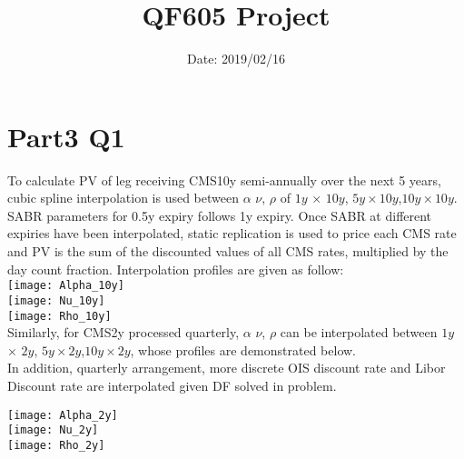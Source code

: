 \documentclass{article}
\title{\textbf{QF605 Project}}
\date{Date: 2019/02/16}
\begin{document}
	\maketitle

\section{Part3 Q1}

\noindent To calculate PV of leg receiving CMS10y semi-annually over the next 5 years, cubic spline interpolation is used between $\alpha$ $\nu$, $\rho$ of $1y$ $\times$ $10y$, $5y\times10y$,$10y\times10y$. SABR parameters for 0.5y expiry follows 1y expiry. Once SABR at different expiries have been interpolated, static replication is used to price each CMS rate and PV is the sum of the discounted values of all CMS rates, multiplied by the day count fraction. Interpolation profiles are given as follow:\\

\texttt{[image: Alpha\_10y]}\\
\texttt{[image: Nu\_10y]}\\
\texttt{[image: Rho\_10y]}\\


Similarly, for CMS2y processed quarterly, $\alpha$ $\nu$, $\rho$ can be interpolated between $1y$ $\times$ $2y$, $5y\times2y$,$10y\times2y$, whose profiles are demonstrated below.\\ In addition, quarterly arrangement, more discrete OIS discount rate and Libor Discount rate are interpolated given DF solved in problem.

\texttt{[image: Alpha\_2y]}\\
\texttt{[image: Nu\_2y]}\\
\texttt{[image: Rho\_2y]}\\
\end{document}
